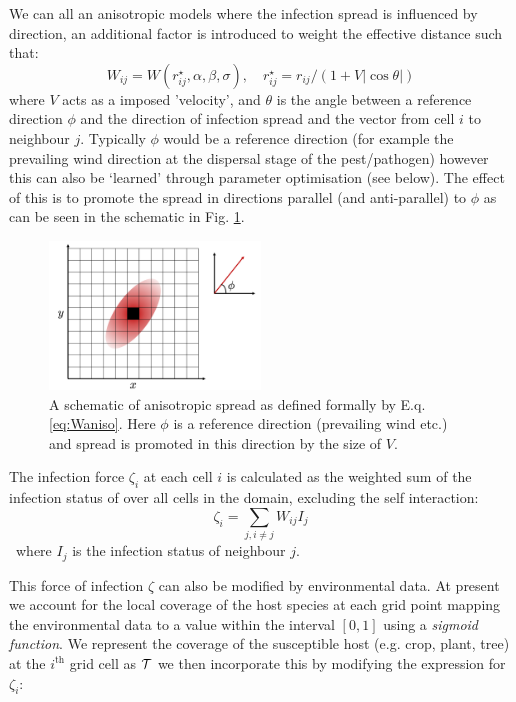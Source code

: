 \documentclass[12pt]{article}
\begin{document}
We can all an anisotropic models where the infection spread is influenced by direction, an additional factor is introduced to weight the effective distance such that:
\begin{equation}\label{eq:Waniso}
W_{ij}=W(r_{ij}^{\star},\alpha, \beta, \sigma), \quad r_{ij}^{\star}=r_{ij}/(1+V |\cos \theta|)
\end{equation}
where $V$ acts as a imposed 'velocity', and $\theta$ is the angle between a reference direction $\phi$ and  the direction of infection spread and the vector from cell $i$ to neighbour $j$. 
Typically $\phi$ would be a reference direction (for example the prevailing wind direction at the dispersal stage of the pest/pathogen) however this can also be `learned' through parameter optimisation (see below). The effect of this is to promote the spread in directions parallel (and anti-parallel) to $\phi$ as can be seen in the schematic in  Fig. \ref{fig:sketch2}.

\begin{figure}[h]
    \centering
    \includegraphics[width=0.5\textwidth]{sketch2.png}
    \caption{A schematic of anisotropic spread as defined formally by E.q. \ref{eq:Waniso}. Here $\phi$ is a reference direction (prevailing wind etc.) and spread is promoted in this direction by the size of $V$.}
    \label{fig:sketch2}
\end{figure}


The infection force $\zeta_i$ at each cell $i$ is calculated as the weighted sum of the infection status of over all cells in the domain, excluding the self interaction:
\begin{equation}\label{eq:sumW}
\zeta_{i} = \sum_{j, i\ne j} W_{ij} I_j
\end{equation}\
where $I_j$ is the infection status of neighbour $j$.


This force of infection \( \zeta \) can also be modified by environmental data. At present we account for the local coverage of the host species at each grid point mapping the environmental data to a value within the interval  $[ 0,1 ]$ using a \textit{sigmoid function}. 
We represent the coverage of the susceptible host (e.g. crop, plant, tree) at the $i^{\textrm{th}}$ grid cell as $\cal T$ we then incorporate this by modifying the expression for $\zeta_i$:
\end{document}
